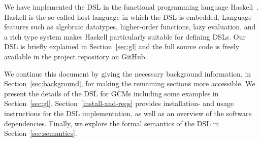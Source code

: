 
We have implemented the \acl{DSL} in the functional programming
language Haskell~\cite{haskell98}.
%
Haskell is the so-called host language in which the \ac{DSL} is
embedded.
%
Language features such as algebraic datatypes, higher-order functions,
lazy evaluation, and a rich type system makes Haskell particularly
suitable for defining \acp{DSL}.
%
Our \ac{DSL} is briefly explained in Section~\ref{sec:gl} and the
full source code is freely available in the project repository on
GitHub.


We continue this document by giving the necessary background
information, in Section~\ref{sec:background}, for making the remaining
sections more accessible.
%
We present the details of the \ac{DSL} for \acp{GCM} including some
examples in Section~\ref{sec:gl}.
%
Section~\ref{install-and-reqs} provides installation- and usage
instructions for the \ac{DSL} implementation, as well as an overview
of the software dependencies.
%
Finally, we explore the formal semantics of the \ac{DSL} in
Section~\ref{sec:semantics}.
